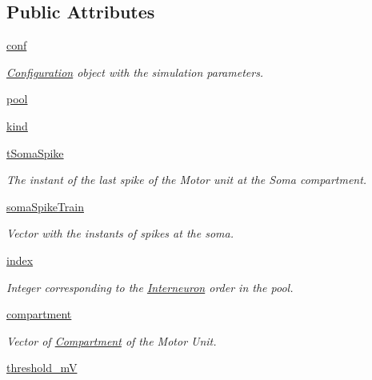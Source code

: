 \subsection*{Public Attributes}
\begin{DoxyCompactItemize}
\item 
\hyperlink{class_interneuron_1_1_interneuron_a20078e4de62213b832ce7f1cf2c587c7}{conf}
\begin{DoxyCompactList}\small\item\em \hyperlink{namespace_configuration}{Configuration} object with the simulation parameters. \end{DoxyCompactList}\item 
\hyperlink{class_interneuron_1_1_interneuron_acc2d5c89c20fc2db87f7af1839069127}{pool}
\item 
\hyperlink{class_interneuron_1_1_interneuron_ac4582711b06d64164ea51789ee2e2558}{kind}
\item 
\hyperlink{class_interneuron_1_1_interneuron_a3fabf689dfda7199c84e44bbf216f90c}{t\+Soma\+Spike}
\begin{DoxyCompactList}\small\item\em The instant of the last spike of the Motor unit at the Soma compartment. \end{DoxyCompactList}\item 
\hyperlink{class_interneuron_1_1_interneuron_abd4d1f53989f0cb098a92112df37ed8a}{soma\+Spike\+Train}
\begin{DoxyCompactList}\small\item\em Vector with the instants of spikes at the soma. \end{DoxyCompactList}\item 
\hyperlink{class_interneuron_1_1_interneuron_ab8834528a49b8be56d59e0afc97019c2}{index}
\begin{DoxyCompactList}\small\item\em Integer corresponding to the \hyperlink{class_interneuron_1_1_interneuron}{Interneuron} order in the pool. \end{DoxyCompactList}\item 
\hyperlink{class_interneuron_1_1_interneuron_a950d7c9a49f86305bc5d456fd924efa9}{compartment}
\begin{DoxyCompactList}\small\item\em Vector of \hyperlink{namespace_compartment}{Compartment} of the Motor Unit. \end{DoxyCompactList}\item 
\hyperlink{class_interneuron_1_1_interneuron_a0e69e0be9f68e8099f5cde10e0b1bea1}{threshold\+\_\+mV}

\end{DoxyCompactItemize}
